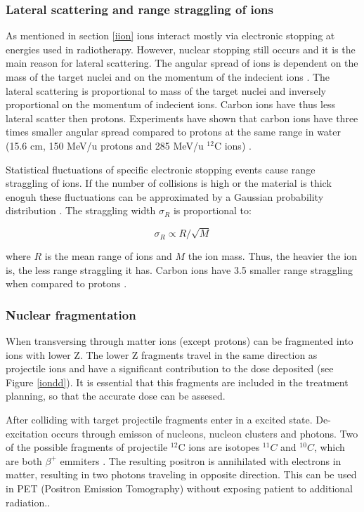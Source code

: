 \documentclass[type=dr, dr=rernat, accentcolor=tud7b,colorbacktitle, bigchapter, openright, twoside, 12pt ]{tudthesis}
\begin{document}
\subsubsection{Lateral scattering and range straggling of ions}
\label{scat}
As mentioned in section \ref{iion} ions interact mostly via electronic stopping at energies used in radiotherapy. However, nuclear stopping still occurs and it is the main reason for lateral scattering.
The angular spread of ions is dependent on the mass of the target nuclei and on the momentum of the indecient ions \cite{Moliere1948}. The lateral scattering is proportional to mass of the target nuclei and inversely proportional
on the momentum of indecient ions. Carbon ions have thus less lateral scatter then protons. Experiments have shown that carbon ions have three times smaller angular spread compared to protons at the same range in water 
(15.6 cm, 150 MeV/u protons and 285 MeV/u $^{12}$C ions) \cite{Schardt2010}.

Statistical fluctuations of specific electronic stopping events cause range straggling of ions. If the number of collisions is high or the material is thick enoguh these fluctuations can be approximated by
a Gaussian probability distribution \cite{Bohr1940, Ahlen1980}. The straggling width $\sigma_R$ is proportional to:

\begin{equation}
 \sigma_R \propto R/\sqrt{M}
\end{equation}

where $R$ is the mean range of ions and $M$ the ion mass. Thus, the heavier the ion is, the less range straggling it has. Carbon ions have 3.5 smaller range straggling when compared to protons \cite{Schardt2010}.

\subsubsection{Nuclear fragmentation}
\label{nuclfrag}

When transversing through matter ions (except protons) can be fragmented into ions with lower Z. The lower Z fragments travel in the same direction as projectile ions and 
have a significant contribution to the dose deposited (see Figure \ref{iondd}). It is essential that this fragments are included in the treatment planning, so that the accurate dose can be assesed.

After colliding with target projectile fragments enter in a excited state. De-excitation occurs through
emisson of nucleons, nucleon clusters and photons. Two of the possible fragments of projectile $^{12}$C ions are isotopes $^{11}C$ and $^{10}C$, which are both $\beta^+$ emmiters \cite{Kraft2000}.
The resulting positron is annihilated with electrons in matter, resulting in two photons traveling in opposite direction. This can be used in PET (Positron Emission Tomography) without exposing patient
to additional radiation.. 
\end{document}
